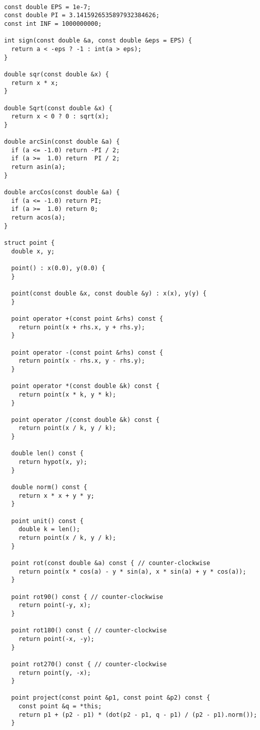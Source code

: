 \begin{lstlisting}

const double EPS = 1e-7;
const double PI = 3.1415926535897932384626;
const int INF = 1000000000;

int sign(const double &a, const double &eps = EPS) {
  return a < -eps ? -1 : int(a > eps);
}

double sqr(const double &x) {
  return x * x;
}

double Sqrt(const double &x) {
  return x < 0 ? 0 : sqrt(x);
}

double arcSin(const double &a) {
  if (a <= -1.0) return -PI / 2;
  if (a >=  1.0) return  PI / 2;
  return asin(a);
}

double arcCos(const double &a) {
  if (a <= -1.0) return PI;
  if (a >=  1.0) return 0;
  return acos(a);
}

struct point {
  double x, y;

  point() : x(0.0), y(0.0) {
  }

  point(const double &x, const double &y) : x(x), y(y) {
  }

  point operator +(const point &rhs) const {
    return point(x + rhs.x, y + rhs.y);
  }

  point operator -(const point &rhs) const {
    return point(x - rhs.x, y - rhs.y);
  }

  point operator *(const double &k) const {
    return point(x * k, y * k);
  }

  point operator /(const double &k) const {
    return point(x / k, y / k);
  }

  double len() const {
    return hypot(x, y);
  }

  double norm() const {
    return x * x + y * y;
  }

  point unit() const {
    double k = len();
    return point(x / k, y / k);
  }

  point rot(const double &a) const { // counter-clockwise
    return point(x * cos(a) - y * sin(a), x * sin(a) + y * cos(a));
  }

  point rot90() const { // counter-clockwise
    return point(-y, x);
  }

  point rot180() const { // counter-clockwise
    return point(-x, -y);
  }

  point rot270() const { // counter-clockwise
    return point(y, -x);
  }

  point project(const point &p1, const point &p2) const {
    const point &q = *this;
    return p1 + (p2 - p1) * (dot(p2 - p1, q - p1) / (p2 - p1).norm());
  }


\end{lstlisting}
